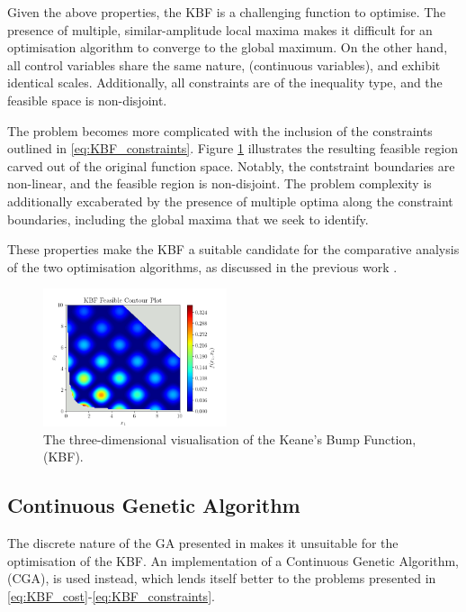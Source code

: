 \documentclass[10pt]{article}
\begin{document}
\begin{multicols}{2}
Given the above properties, the KBF is a challenging function to optimise. The presence of multiple, similar-amplitude local maxima makes it difficult for an optimisation algorithm to converge to the global maximum. On the other hand, all control variables share the same nature, (continuous variables), and exhibit identical scales. Additionally, all constraints are of the inequality type, and the feasible space is non-disjoint.

The problem becomes more complicated with the inclusion of the constraints outlined in \ref{eq:KBF_constraints}. Figure \ref{fig:KBF_Feasible} illustrates the resulting feasible region carved out of the original function space. Notably, the contstraint boundaries are non-linear, and the feasible region is non-disjoint. The problem complexity is additionally excaberated by the presence of multiple optima along the constraint boundaries, including the global maxima that we seek to identify.

These properties make the KBF a suitable candidate for the comparative analysis of the two optimisation algorithms, as discussed in the previous work \cite{ELBELTAGY1999639}.

\begin{figure}[H]
    \centering
    \includegraphics[width=0.48\textwidth]{../figures/KBF/KBF Feasible_contour.png}
    \captionsetup{justification=centering}
    \caption{The three-dimensional visualisation of the Keane's Bump Function, (KBF).}
    \label{fig:KBF_Feasible}
\end{figure}

\subsection{Continuous Genetic Algorithm}

The discrete nature of the GA presented in \cite{parks2023geneticalgorithms} makes it unsuitable for the optimisation of the KBF. An implementation of a Continuous Genetic Algorithm, (CGA), is used instead, which lends itself better to the problems presented in \ref{eq:KBF_cost}-\ref{eq:KBF_constraints}.


\end{multicols}
\end{document}
